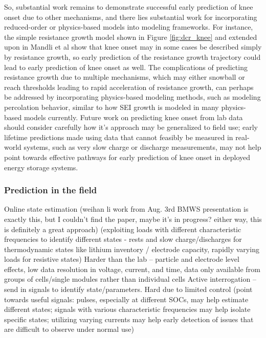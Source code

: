 \documentclass[journal=jpclcd,manuscript=article]{achemso}
\begin{document}
So, substantial work remains to demonstrate successful early prediction of knee onset due to other mechanisms, and there lies substantial work for incorporating reduced-order or physics-based models into modeling frameworks. For instance, the simple resistance growth model shown in Figure \ref{fig:dcr_knee} and extended upon in Mandli et al \cite{mandli_analysis_2019} show that knee onset may in some cases be described simply by resistance growth, so early prediction of the resistance growth trajectory could lead to early prediction of knee onset as well. The complications of predicting resistance growth due to multiple mechanisms, which may either snowball or reach thresholds leading to rapid acceleration of resistance growth, can perhaps be addressed by incorporating physics-based modeling methods, such as modeling percolation behavior, similar to how SEI growth is modeled in many physics-based models currently. Future work on predicting knee onset from lab data should consider carefully how it's approach may be generalized to field use; early lifetime predictions made using data that cannot feasibly be measured in real-world systems, such as very slow charge or discharge measurements, may not help point towards effective pathways for early prediction of knee onset in deployed energy storage systems.

\subsubsection{Prediction in the field}
Online state estimation (weihan li work from Aug. 3rd BMWS presentation is exactly this, but I couldn't find the paper, maybe it's in progress? either way, this is definitely a great approach) (exploiting loads with different characteristic frequencies to identify different states - rests and slow charge/discharges for thermodynamic states like lithium inventory / electrode capacity, rapidly varying loads for resistive states)
Harder than the lab -- particle and electrode level effects, low data resolution in voltage, current, and time, data only available from groups of cells/single modules rather than individual cells
Active interrogation -- send in signals to identify state/parameters. Hard due to limited control (point towards useful signals: pulses, especially at different SOCs, may help estimate different states; signals with various characteristic frequencies may help isolate specific states; utilizing varying currents may help early detection of issues that are difficult to observe under normal use)
\end{document}
